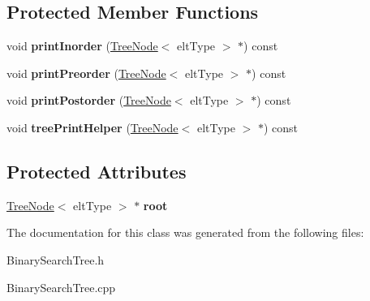 \subsection*{Protected Member Functions}
\begin{DoxyCompactItemize}
\item 
\hypertarget{classBinaryTree_a2f2a53a7026a398422a16f45ffdb84d2}{void {\bfseries print\-Inorder} (\hyperlink{classTreeNode}{Tree\-Node}$<$ elt\-Type $>$ $\ast$) const }\label{classBinaryTree_a2f2a53a7026a398422a16f45ffdb84d2}

\item 
\hypertarget{classBinaryTree_a2790d45736e6232043d594a0cfcfd4b8}{void {\bfseries print\-Preorder} (\hyperlink{classTreeNode}{Tree\-Node}$<$ elt\-Type $>$ $\ast$) const }\label{classBinaryTree_a2790d45736e6232043d594a0cfcfd4b8}

\item 
\hypertarget{classBinaryTree_a1049f7854366dd4f7e95a195153f1f13}{void {\bfseries print\-Postorder} (\hyperlink{classTreeNode}{Tree\-Node}$<$ elt\-Type $>$ $\ast$) const }\label{classBinaryTree_a1049f7854366dd4f7e95a195153f1f13}

\item 
\hypertarget{classBinaryTree_ae0643f5ffacc6d6152bee45c6c1fcd16}{void {\bfseries tree\-Print\-Helper} (\hyperlink{classTreeNode}{Tree\-Node}$<$ elt\-Type $>$ $\ast$) const }\label{classBinaryTree_ae0643f5ffacc6d6152bee45c6c1fcd16}

\end{DoxyCompactItemize}
\subsection*{Protected Attributes}
\begin{DoxyCompactItemize}
\item 
\hypertarget{classBinaryTree_a89df572c2c98d79570aeabfe2a74a987}{\hyperlink{classTreeNode}{Tree\-Node}$<$ elt\-Type $>$ $\ast$ {\bfseries root}}\label{classBinaryTree_a89df572c2c98d79570aeabfe2a74a987}

\end{DoxyCompactItemize}


The documentation for this class was generated from the following files\-:\begin{DoxyCompactItemize}
\item 
Binary\-Search\-Tree.\-h\item 
Binary\-Search\-Tree.\-cpp\end{DoxyCompactItemize}
